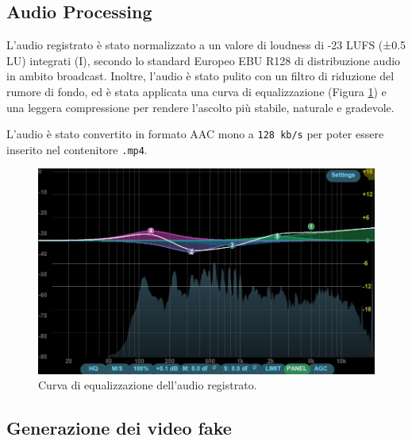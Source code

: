\subsection{Audio Processing}

L'audio registrato è stato normalizzato a un valore di loudness di -23 LUFS (±0.5 LU) integrati (I), secondo lo standard Europeo EBU R128 di distribuzione audio in ambito broadcast. Inoltre, l'audio è stato pulito con un filtro di riduzione del rumore di fondo, ed è stata applicata una curva di equalizzazione (Figura \ref{fig:eq_curve}) e una leggera compressione per rendere l'ascolto più stabile, naturale e gradevole.

L'audio è stato convertito in formato AAC mono a \verb|128 kb/s| per poter essere inserito nel contenitore \verb|.mp4|.

\begin{figure}[t]
    \centering
    \includegraphics[width=0.62\linewidth]{images/eq_curve}
    \caption{Curva di equalizzazione dell'audio registrato.}
    \label{fig:eq_curve}
\end{figure}

\subsection{Generazione dei video fake}

\clearpage